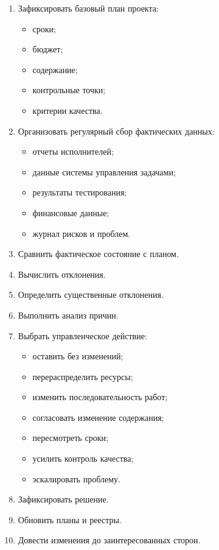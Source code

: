 \documentclass[12pt,a4paper]{article}
\begin{document}
\begin{enumerate}
    \item Зафиксировать базовый план проекта:
    \begin{itemize}
        \item сроки;
        \item бюджет;
        \item содержание;
        \item контрольные точки;
        \item критерии качества.
    \end{itemize}
    \item Организовать регулярный сбор фактических данных:
    \begin{itemize}
        \item отчеты исполнителей;
        \item данные системы управления задачами;
        \item результаты тестирования;
        \item финансовые данные;
        \item журнал рисков и проблем.
    \end{itemize}
    \item Сравнить фактическое состояние с планом.
    \item Вычислить отклонения.
    \item Определить существенные отклонения.
    \item Выполнить анализ причин.
    \item Выбрать управленческое действие:
    \begin{itemize}
        \item оставить без изменений;
        \item перераспределить ресурсы;
        \item изменить последовательность работ;
        \item согласовать изменение содержания;
        \item пересмотреть сроки;
        \item усилить контроль качества;
        \item эскалировать проблему.
    \end{itemize}
    \item Зафиксировать решение.
    \item Обновить планы и реестры.
    \item Довести изменения до заинтересованных сторон.
\end{enumerate}
\end{document}
